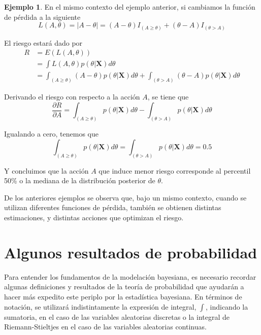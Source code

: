 \documentclass[
  spanish,
]{book}
\theoremstyle{definition}
\theoremstyle{definition}
\newtheorem{example}{Ejemplo}[chapter]
\theoremstyle{definition}
\theoremstyle{remark}
\begin{document}
\begin{example}
\protect\hypertarget{exm:unnamed-chunk-3}{}{\label{exm:unnamed-chunk-3} }En el mismo contexto del ejemplo anterior, si cambiamos la función de pérdida a la siguiente
\begin{equation*}
L(A,\theta)=|A-\theta|=(A-\theta)I_{(A\geq\theta)}+(\theta-A)I_{(\theta>A)}
\end{equation*}

El riesgo estará dado por
\begin{align*}
R&=E(L(A,\theta))\\
&=\int L(A,\theta)p(\theta|\mathbf{X})d\theta\\
&=\int_{(A\geq\theta)}(A-\theta)p(\theta|\mathbf{X})d\theta+\int_{(\theta>A)}(\theta-A)p(\theta|\mathbf{X})d\theta
\end{align*}

Derivando el riesgo con respecto a la acción \(A\), se tiene que
\begin{equation*}
\frac{\partial R}{\partial A}=\int_{(A\geq\theta)}p(\theta|\mathbf{X})d\theta-\int_{(\theta>A)}p(\theta|\mathbf{X})d\theta
\end{equation*}

Igualando a cero, tenemos que
\begin{equation*}
\int_{(A\geq\theta)}p(\theta|\mathbf{X})d\theta=\int_{(\theta>A)}p(\theta|\mathbf{X})d\theta=0.5
\end{equation*}

Y concluimos que la acción \(A\) que induce menor riesgo corresponde al percentil 50\% o la mediana de la distribución posterior de \(\theta\).
\end{example}

De los anteriores ejemplos se observa que, bajo un mismo contexto, cuando se utilizan diferentes funciones de pérdida, también se obtienen distintas estimaciones, y distintas acciones que optimizan el riesgo.

\hypertarget{algunos-resultados-de-probabilidad}{%
\section{Algunos resultados de probabilidad}\label{algunos-resultados-de-probabilidad}}

Para entender los fundamentos de la modelación bayesiana, es necesario
recordar algunas definiciones y resultados de la teoría de probabilidad
que ayudarán a hacer más expedito este periplo por la estadística
bayesiana. En términos de notación, se utilizará indistintamente la
expresión de integral, \(\int\), indicando la sumatoria, en el caso de las
variables aleatorias discretas o la integral de Riemann-Stieltjes en el
caso de las variables aleatorias continuas.
\end{document}
